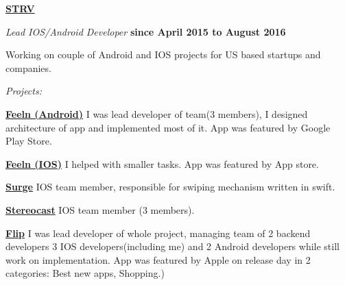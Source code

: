 \documentclass[10pt]{article}
\newenvironment{outerlist}[0]%
        {\begin{itemize}}
        {\end{itemize}
         \vspace{-.6\baselineskip}}
\newenvironment{innerlist}[0]%
        {\begin{compactitem}}
        {\end{compactitem}}
\newcommand{\blankline}{\quad\pagebreak[2]}
\begin{document}
\href{http://www.strv.com/}{\textbf{STRV}}
\begin{outerlist}
  \item[] \textit{Lead IOS/Android Developer}%
          \hfill \textbf{since April 2015 to August 2016}
  \begin{innerlist}
    \item[] Working on couple of Android and IOS projects for US based startups
and companies.
  \end{innerlist}
    \item[] \textit{Projects:}%
    	 \begin{innerlist}
	 	 \item[]  \href{https://play.google.com/store/apps/details?id=com.feeln.android}{\textbf{Feeln (Android)}} \newline
		 I was lead developer of team(3 members), I designed architecture of app
and implemented most of it. App was featured by Google Play Store.
		\newline
	 	 \item[]  \href{https://itunes.apple.com/us/app/feeln/id472567577?mt=8}{\textbf{Feeln (IOS)}} \newline
		 I helped with smaller tasks. App was featured by App store.
		 \newline
	 	 \item[]  \href{https://itunes.apple.com/us/app/surge-gay-dating-app-for-gay/id709551897?mt=8}{\textbf{Surge}} \newline
		 IOS team member, responsible for swiping mechanism written in
swift.
		\newline
	 	 \item[]  \href{https://itunes.apple.com/us/app/stereocast-exclusive-music/id1027457656?mt=8}{\textbf{Stereocast}} \newline
		 IOS team member (3 members).
		 \newline
	 	 \item[]  \href{https://itunes.apple.com/us/app/flip-everyones-sneaker-connect/id961287853?mt=8}{\textbf{Flip}} \newline
		  I was lead developer of whole project, managing
team of 2 backend developers 3 IOS developers(including me) and 2
Android developers while still work on implementation. App was featured
by Apple on release day in 2 categories: Best new apps, Shopping.)
	 \end{innerlist}
\end{outerlist}

\blankline
\end{document}

